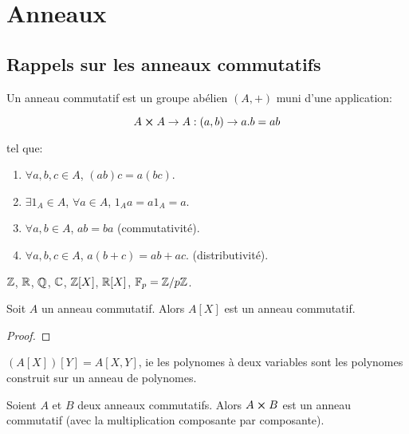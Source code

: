 \chapter{Anneaux}

\section{Rappels sur les anneaux commutatifs}

\begin{definition}
	Un anneau commutatif est un groupe abélien $(A, +)$ muni d'une application:

	\begin{equation*}
		A \cross A \rightarrow A : (a, b) \rightarrow a.b = ab
	\end{equation*}

	tel que:

	\begin{enumerate}
		\item $\forall a, b, c \in A$, $(ab)c = a(bc)$.
		\item $\exists 1_{A} \in A$, $\forall a \in A$, $1_{A} a = a 1_{A} = a$.
		\item $\forall a, b \in A$, $ab = ba$ (commutativité).
		\item $\forall a, b, c \in A$, $a(b + c) = ab + ac$. (distributivité).
	\end{enumerate}
\end{definition}

\begin{exemple}
	$\mathbb{Z}$, $\mathbb{R}$, $\mathbb{Q}$, $\mathbb{C}$, $\mathbb{Z}[X]$, $\mathbb{R}[X]$,
	$\mathbb{F}_{p} = \mathbb{Z}/p\mathbb{Z}$.
\end{exemple}

\begin{proposition}
	Soit $A$ un anneau commutatif. Alors $A[X]$ est un anneau commutatif.
\end{proposition}

\ifdefined\outputproof
\begin{proof}

\end{proof}
\fi

\begin{remarque}
	$(A[X])[Y] = A[X, Y]$, ie les polynomes à deux variables sont les polynomes
	construit sur un anneau de polynomes.
\end{remarque}

\begin{proposition}
	Soient $A$ et $B$ deux anneaux commutatifs. Alors $A \cross B$ est un
	anneau commutatif (avec la multiplication composante par composante).
\end{proposition}

